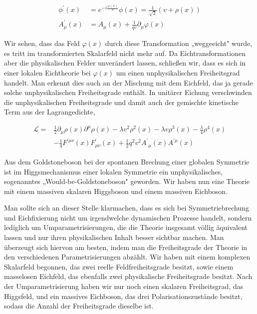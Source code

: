 \documentclass[10pt, letterpaper]{article}
\begin{document}
$$
\begin{aligned}
\phi^{\prime}(x) & =e^{-i \frac{\varphi(x)}{v}} \phi(x)=\frac{1}{\sqrt{2}}(v+\rho(x)) \\
A_{\mu}^{\prime}(x) & =A_{\mu}(x)+\frac{1}{q v} \partial_{\mu} \varphi(x)
\end{aligned}
$$

Wir sehen, dass das Feld $\varphi(x)$ durch diese Transformation „weggeeicht" wurde, es tritt im transformierten Skalarfeld nicht mehr auf. Da Eichtransformationen aber die physikalischen Felder unverändert lassen, schließen wir, dass es sich in einer lokalen Eichtheorie bei $\varphi(x)$ um einen unphysikalischen Freiheitsgrad handelt. Man erkennt dies auch an der Mischung mit dem Eichfeld, das ja gerade solche unphysikalischen Freiheitsgrade enthält. In unitärer Eichung verschwinden die unphysikalischen Freiheitsgrade und damit auch der gemischte kinetische Term aus der Lagrangedichte,

$$
\begin{aligned}
\mathscr{L}= & \frac{1}{2} \partial_{\mu} \rho(x) \partial^{\mu} \rho(x)-\lambda v^{2} \rho^{2}(x)-\lambda v \rho^{3}(x)-\frac{\lambda}{4} \rho^{4}(x) \\
& -\frac{1}{4} F^{\prime \mu \nu}(x) F_{\mu \nu}^{\prime}(x)+\frac{1}{2} q^{2} v^{2} A^{\prime}{ }_{\mu}(x) A^{\prime \mu}(x)
\end{aligned}
$$

Aus dem Goldstoneboson bei der spontanen Brechung einer globalen Symmetrie ist im Higgsmechanismus einer lokalen Symmetrie ein unphysikalisches, sogenanntes „Would-be-Goldstoneboson" geworden. Wir haben nun eine Theorie mit einem massiven skalaren Higgsboson und einem massiven Eichboson.

Man sollte sich an dieser Stelle klarmachen, dass es sich bei Symmetriebrechung und Eichfixierung nicht um irgendwelche dynamischen Prozesse handelt, sondern lediglich um Umparametrisierungen, die die Theorie insgesamt völlig äquivalent lassen und nur ihren physikalischen Inhalt besser sichtbar machen. Man überzeugt sich hiervon am besten, indem man die Freiheitsgrade der Theorie in den verschiedenen Parametrisierungen abzählt. Wir haben mit einem komplexen Skalarfeld begonnen, das zwei reelle Feldfreiheitsgrade besitzt, sowie einem masselosen Eichfeld, das ebenfalls zwei physikalische Freiheitsgrade besitzt. Nach der Umparametrisierung haben wir nur noch einen skalaren Freiheitsgrad, das Higgsfeld, und ein massives Eichboson, das drei Polarisationszustände besitzt, sodass die Anzahl der Freiheitsgrade dieselbe ist.
\end{document}
